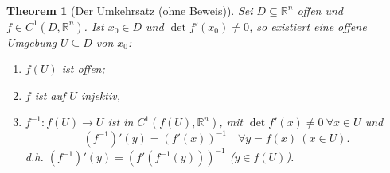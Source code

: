 \documentclass[12pt]{extreport} %
\newcommand{\R}{\mathbb{R}}
\theoremstyle{named}
\newtheorem{unnamedtheorem}{Theorem} \counterwithin{unnamedtheorem}{chapter}
\theoremstyle{nnamed}
\theoremstyle{itshape}
\theoremstyle{normal}
\begin{document}
\begin{unnamedtheorem}[Der Umkehrsatz (ohne Beweis)] \label{19.6:satz}
	Sei $D \subseteq \R^{n}$ offen und $f \in C^{1}(D, \R^{n})$. Ist $x_{0} \in D$ und $\det f'(x_{0}) \neq 0$, so existiert eine offene Umgebung $U \subseteq D$ von $x_{0}$: 
	\begin{enumerate}
		\item $f(U)$ ist offen;
		\item $f$ ist auf $U$ injektiv,
		\item $f^{-1}: f(U) \rightarrow U$ ist in $C^{1}( f(U), \R^{n})$, mit $\det f'(x) \neq 0 ~\forall x \in U$ und 
			$$ \left( f^{-1} \right)'(y) = \left( f'(x) \right)^{-1} \quad \forall y = f(x) ~(x \in U). $$
			d.h. $\left( f^{-1} \right)'(y) = \left( f' \left( f^{-1}(y) \right) \right)^{-1}$ ($y \in f(U)$).
	\end{enumerate}
\end{unnamedtheorem}
\end{document}
